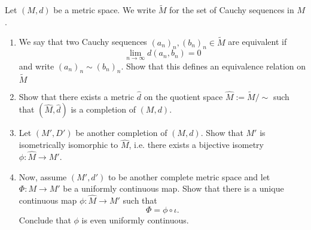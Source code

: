\begin{Problem}
	Let $(M, d)$ be a metric space. We write $\tilde{M}$ for the set of Cauchy sequences in $M$. 
	\begin{enumerate}
		\item We say that two Cauchy sequences $(a_n)_n, (b_n)_n\in \tilde{M}$ are equivalent if
			\[
			\lim_{n \to \infty} d(a_n, b_n)=0
			\] 
			and write $(a_n)_n\sim (b_n)_n$. Show that this defines an equivalence relation on $\tilde{M}$
		\item Show that there exists a metric $\hat{d}$ on the quotient space $\hat{M}:=\tilde{M} / \sim$ such that $(\hat{M}, \hat{d})$ is a completion of $(M, d)$.
		\item Let $(M', D')$ be another completion of $(M, d)$. Show that $M'$ is isometrically isomorphic to $\hat{M}$, i.e. there exists a bijective isometry $\phi: \hat{M}\to M'$.
		\item Now, assume $(M', d')$ to be another complete metric space and let $\Phi:M\to M'$ be a uniformly continuous map. Show that there is a unique continuous map $\phi:\hat{M}\to M'$ such that
			\[
			\Phi=\phi\circ \iota
			.\] 
			Conclude that $\phi$ is even uniformly continuous.
	\end{enumerate}
\end{Problem}
